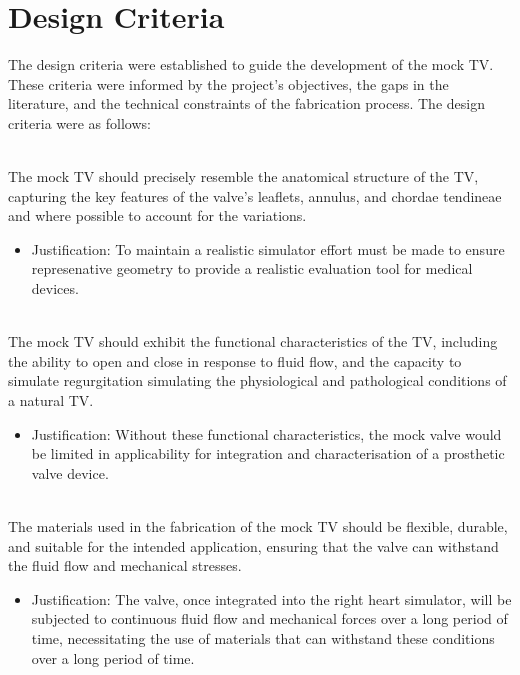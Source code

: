 \section{Design Criteria}\label{sec:Design Criteria}
The design criteria were established to guide the development of the mock \gls{TV}. These criteria were informed by the project's objectives, the gaps in the literature, and the technical constraints of the fabrication process.
The design criteria were as follows:
\begin{fullwidth}
    \\ The mock \gls{TV} should precisely resemble the anatomical structure of the \gls{TV}, capturing the key features of the valve's leaflets, annulus, and chordae tendineae and where possible to account for the variations.
    \begin{itemize}
        \item Justification: To maintain a realistic simulator effort must be made to ensure represenative geometry to provide a realistic evaluation tool for medical devices.
    \end{itemize}

    \label{sec:Functional Performance}\\ The mock \gls{TV} should exhibit the functional characteristics of the \gls{TV}, including the ability to open and close in response to fluid flow, and the capacity to simulate regurgitation simulating the physiological and pathological conditions of a natural \gls{TV}.
    \begin{itemize}
        \item Justification: Without these functional characteristics, the mock valve would be limited in applicability for integration and characterisation of a prosthetic valve device.
    \end{itemize}

    \\ The materials used in the fabrication of the mock \gls{TV} should be flexible, durable, and suitable for the intended application, ensuring that the valve can withstand the fluid flow and mechanical stresses.
    \begin{itemize}
        \item Justification: The valve, once integrated into the right heart simulator, will be subjected to continuous fluid flow and mechanical forces over a long period of time, necessitating the use of materials that can withstand these conditions over a long period of time.
    \end{itemize}


\end{fullwidth}
